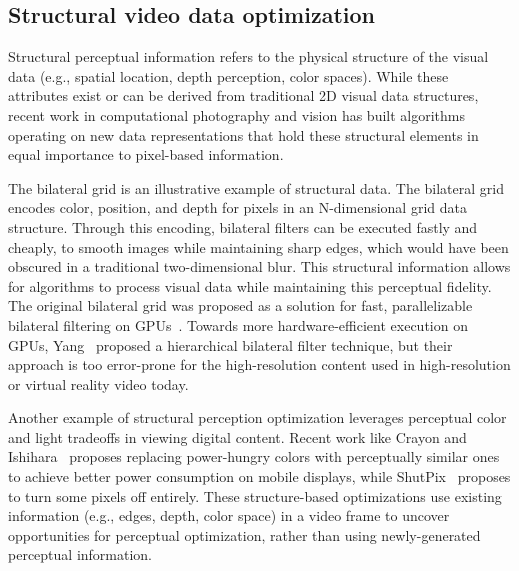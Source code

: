 \subsection{Structural video data optimization}
Structural perceptual information refers to the physical structure of the visual data (e.g., spatial location, depth perception, color spaces).
While these attributes exist or can be derived from traditional 2D visual data structures, recent work in computational photography and vision has built algorithms operating on new data representations that hold these structural elements in equal importance to pixel-based information.

The bilateral grid is an illustrative example of structural data. The bilateral grid encodes color, position, and depth for pixels in an N-dimensional grid data structure.
Through this encoding, bilateral filters can be executed fastly and cheaply, to smooth images while maintaining sharp edges, which would have been obscured in a traditional two-dimensional blur.
This structural information allows for algorithms to process visual data while maintaining this perceptual fidelity.
The original bilateral grid was proposed as a solution for fast, parallelizable bilateral filtering on GPUs~\cite{Chen2007}.
Towards more hardware-efficient execution on GPUs, Yang~\cite{pami_gpu_stereo14} proposed a hierarchical bilateral filter technique, but their approach is too error-prone for the high-resolution content used in high-resolution or virtual reality video today.

Another example of structural perception optimization leverages perceptual color and light tradeoffs in viewing digital content. Recent work like Crayon \cite{crayon} and Ishihara~\cite{stanley2018perceived} proposes replacing power-hungry colors with perceptually similar ones to achieve better power consumption on mobile displays, while ShutPix~\cite{Yan:2017:TMP:3123266.3123344} proposes to turn some pixels off entirely. These structure-based optimizations use existing information (e.g., edges, depth, color space) in a video frame to uncover opportunities for perceptual optimization, rather than using newly-generated perceptual information.

